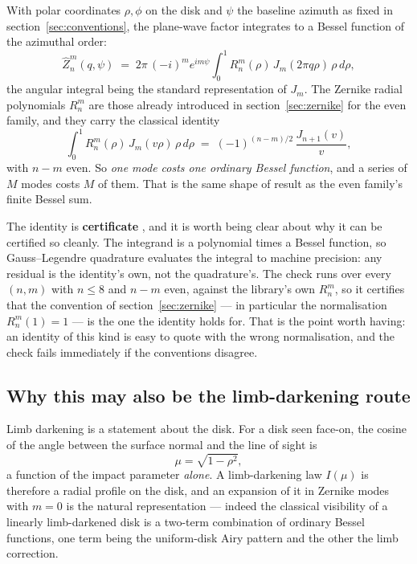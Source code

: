 With polar coordinates $\rho,\phi$ on the disk and $\psi$ the baseline azimuth as fixed in
section~\ref{sec:conventions}, the plane-wave factor integrates to a Bessel function of the
azimuthal order:
\begin{equation}
  \widehat{Z}_n^m(q,\psi) \;=\; 2\pi\,(-i)^m e^{im\psi}
  \int_0^1 R_n^m(\rho)\, J_m(2\pi q\rho)\, \rho \, d\rho ,
  \label{eq:zernike-transform}
\end{equation}
the angular integral being the standard representation of $J_m$.  The Zernike radial
polynomials $R_n^m$ are those already introduced in section~\ref{sec:zernike} for the even
family, and they carry the classical identity
\begin{equation}
  \int_0^1 R_n^m(\rho)\, J_m(v\rho)\, \rho\, d\rho
  \;=\; (-1)^{(n-m)/2}\,\frac{J_{n+1}(v)}{v} ,
  \label{eq:zernike-identity}
\end{equation}
with $n-m$ even.  So \emph{one mode costs one ordinary Bessel function}, and a series of $M$
modes costs $M$ of them.  That is the same shape of result as the even family's finite
Bessel sum.

The identity is \textbf{certificate }, and it is worth being clear about why it can
be certified so cleanly.  The integrand is a polynomial times a Bessel function, so
Gauss--Legendre quadrature evaluates the integral to machine precision: any residual is the
identity's own, not the quadrature's.  The check runs over every $(n,m)$ with $n \le 8$ and
$n-m$ even, against the library's own $R_n^m$, so it certifies that the convention of
section~\ref{sec:zernike} --- in particular the normalisation $R_n^m(1) = 1$ --- is the one
the identity holds for.  That is the point worth having: an identity of this kind is easy to
quote with the wrong normalisation, and the check fails immediately if the conventions
disagree.

\subsection{Why this may also be the limb-darkening route}
\label{sec:disk-modes-limb}

Limb darkening is a statement about the disk.  For a disk seen face-on, the cosine of the
angle between the surface normal and the line of sight is
\begin{equation}
  \mu = \sqrt{1-\rho^2} ,
  \label{eq:limb-mu}
\end{equation}
a function of the impact parameter \emph{alone}.  A limb-darkening law $I(\mu)$ is therefore
a radial profile on the disk, and an expansion of it in Zernike modes with $m = 0$ is the
natural representation --- indeed the classical visibility of a linearly limb-darkened disk
is a two-term combination of ordinary Bessel functions, one term being the uniform-disk
Airy pattern and the other the limb correction.

